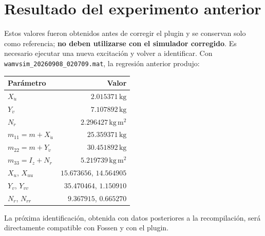 \documentclass[11pt,a4paper]{article}
\begin{document}
\section{Resultado del experimento anterior}
Estos valores fueron obtenidos antes de corregir el plugin y se conservan solo como referencia; \textbf{no deben utilizarse con el simulador corregido}. Es necesario ejecutar una nueva excitación y volver a identificar. Con \texttt{wamvsim\_20260908\_020709.mat}, la regresión anterior produjo:
\begin{center}
\begin{tabular}{@{}lr@{}}
\toprule
Parámetro & Valor \\
\midrule
$X_{\dot u}$ & $2.015371\,\mathrm{kg}$ \\
$Y_{\dot v}$ & $7.107892\,\mathrm{kg}$ \\
$N_{\dot r}$ & $2.296427\,\mathrm{kg\,m^2}$ \\
$m_{11}=m+X_{\dot u}$ & $25.359371\,\mathrm{kg}$ \\
$m_{22}=m+Y_{\dot v}$ & $30.451892\,\mathrm{kg}$ \\
$m_{33}=I_z+N_{\dot r}$ & $5.219739\,\mathrm{kg\,m^2}$ \\
$X_u$, $X_{uu}$ & $15.673656$, $14.564905$ \\
$Y_v$, $Y_{vv}$ & $35.470464$, $1.150910$ \\
$N_r$, $N_{rr}$ & $9.367915$, $0.665270$ \\
\bottomrule
\end{tabular}
\end{center}

La próxima identificación, obtenida con datos posteriores a la recompilación, será directamente compatible con Fossen y con el plugin.
\end{document}

